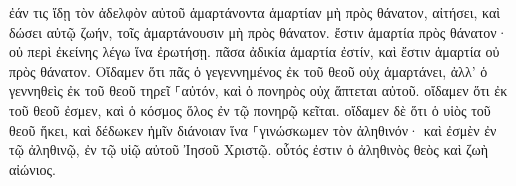 \documentclass{openreader}
\begin{document}
ἐάν τις ἴδῃ τὸν ἀδελφὸν αὐτοῦ ἁμαρτάνοντα ἁμαρτίαν μὴ πρὸς θάνατον, αἰτήσει, καὶ δώσει αὐτῷ ζωήν, τοῖς ἁμαρτάνουσιν μὴ πρὸς θάνατον. ἔστιν ἁμαρτία πρὸς θάνατον· οὐ περὶ ἐκείνης λέγω ἵνα ἐρωτήσῃ. πᾶσα ἀδικία ἁμαρτία ἐστίν, καὶ ἔστιν ἁμαρτία οὐ πρὸς θάνατον. Οἴδαμεν ὅτι πᾶς ὁ γεγεννημένος ἐκ τοῦ θεοῦ οὐχ ἁμαρτάνει, ἀλλ’ ὁ γεννηθεὶς ἐκ τοῦ θεοῦ τηρεῖ ⸀αὐτόν, καὶ ὁ πονηρὸς οὐχ ἅπτεται αὐτοῦ. οἴδαμεν ὅτι ἐκ τοῦ θεοῦ ἐσμεν, καὶ ὁ κόσμος ὅλος ἐν τῷ πονηρῷ κεῖται. οἴδαμεν δὲ ὅτι ὁ υἱὸς τοῦ θεοῦ ἥκει, καὶ δέδωκεν ἡμῖν διάνοιαν ἵνα ⸀γινώσκωμεν τὸν ἀληθινόν· καὶ ἐσμὲν ἐν τῷ ἀληθινῷ, ἐν τῷ υἱῷ αὐτοῦ Ἰησοῦ Χριστῷ. οὗτός ἐστιν ὁ ἀληθινὸς θεὸς καὶ ζωὴ αἰώνιος. 
\end{document}
